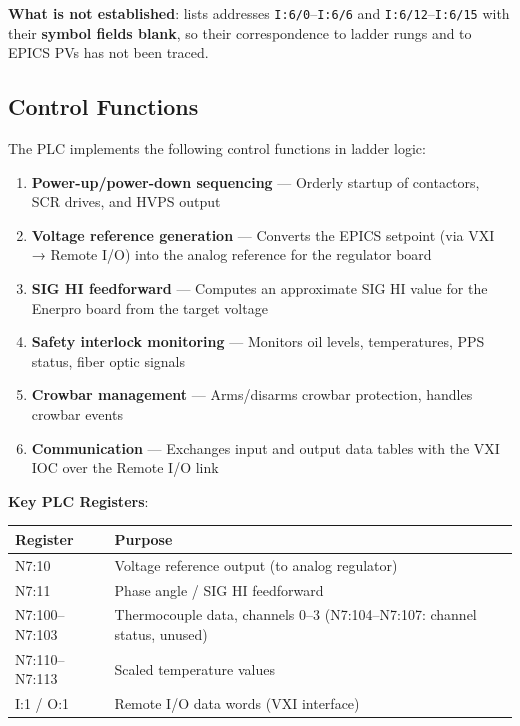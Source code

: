 \begin{keynote}
\textbf{What is not established}:  lists addresses \texttt{I:6/0}--\texttt{I:6/6} and \texttt{I:6/12}--\texttt{I:6/15} with their \textbf{symbol fields blank}, so their correspondence to ladder rungs and to EPICS PVs has not been traced. 
\end{keynote}

\subsection{Control Functions}

The PLC implements the following control functions in ladder logic:

\begin{enumerate}
\def\labelenumi{\arabic{enumi}.}
\tightlist
\item
  \textbf{Power-up/power-down sequencing} --- Orderly startup of contactors, SCR drives, and HVPS output
\item
  \textbf{Voltage reference generation} --- Converts the EPICS setpoint (via VXI → Remote I/O) into the analog reference for the regulator board
\item
  \textbf{SIG HI feedforward} --- Computes an approximate SIG HI value for the Enerpro board from the target voltage
\item
  \textbf{Safety interlock monitoring} --- Monitors oil levels, temperatures, PPS status, fiber optic signals
\item
  \textbf{Crowbar management} --- Arms/disarms crowbar protection, handles crowbar events
\item
  \textbf{Communication} --- Exchanges input and output data tables with the VXI IOC over the Remote I/O link 
\end{enumerate}

\textbf{Key PLC Registers}:

\begin{longtable}[]{@{}ll@{}}
\toprule\noalign{}
Register & Purpose \\
\midrule\noalign{}
\endhead
\bottomrule\noalign{}
\endlastfoot
N7:10 & Voltage reference output (to analog regulator) \\
N7:11 & Phase angle / SIG HI feedforward \\
N7:100--N7:103 & Thermocouple data, channels 0--3 (N7:104--N7:107: channel status, unused) \\
N7:110--N7:113 & Scaled temperature values \\
I:1 / O:1 & Remote I/O data words (VXI interface) \\
\end{longtable}

